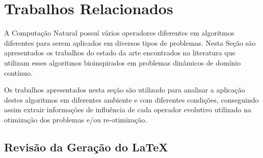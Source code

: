 \chapter{Trabalhos Relacionados}
\label{ch:relacionados}
A Computação Natural possuí vários operadores diferentes em algoritmos diferentes para serem aplicados em diversos tipos de problemas. Nesta Seção são apresentados os trabalhos do estado da arte encontrados na literatura que utilizam esses algoritmos bioinspirados em problemas dinâmicos de domínio contínuo.

Os trabalhos apresentados nesta seção são utilizado para analisar a aplicação destes algoritmos em diferentes ambiente e com diferentes condições, conseguindo assim extrair informações de influência de cada operador evolutivo utilizado na otimização dos problemas e/ou re-otimização.

\section{Revisão da Geração do LaTeX}
\label{sec:revisao_geracao_latex}

